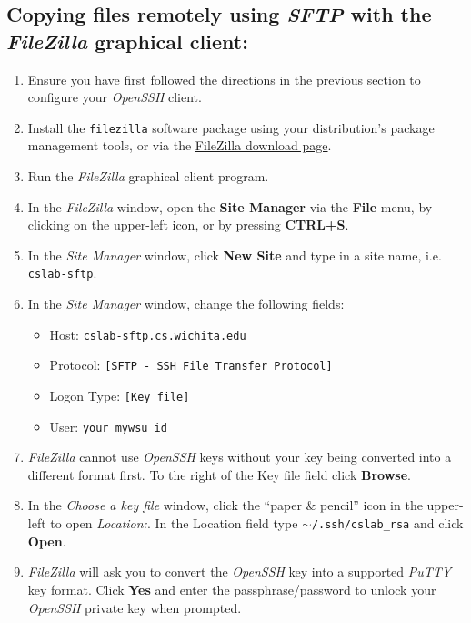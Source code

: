 \documentclass[12pt]{article}
\begin{document}
\begin{flushleft}
\subsection*{Copying files remotely using \textit{SFTP} with the \textit{FileZilla} graphical client:}
\begin{enumerate}
  \item Ensure you have first followed the directions in the previous section to configure your \textit{OpenSSH} client.
  \item Install the \texttt{filezilla} software package using your distribution's package management tools, or via the \href{https://filezilla-project.org/download.php?type=client}{FileZilla download page}.
  \item Run the \textit{FileZilla} graphical client program.
  \item In the \textit{FileZilla} window, open the \textbf{Site Manager} via the \textbf{File} menu, by clicking on the upper-left icon, or by pressing \textbf{CTRL+S}.
  \item In the \textit{Site Manager} window, click \textbf{New Site} and type in a site name, i.e. \texttt{cslab-sftp}.
  \item In the \textit{Site Manager} window, change the following fields:
  \begin{itemize}
    \item Host: \texttt{cslab-sftp.cs.wichita.edu}
    \item Protocol: \texttt{[SFTP - SSH File Transfer Protocol]}
    \item Logon Type: \texttt{[Key file]}
    \item User: \texttt{your\_mywsu\_id}
  \end{itemize}
  \item \textit{FileZilla} cannot use \textit{OpenSSH} keys without your key being converted into a different format first. To the right of the Key file field click \textbf{Browse}.
  \item In the \textit{Choose a key file} window, click the ``paper \& pencil'' icon in the upper-left to open \textit{Location:}. In the Location field type \texttt{$\sim$/.ssh/cslab\_rsa} and click \textbf{Open}.
  \item \textit{FileZilla} will ask you to convert the \textit{OpenSSH} key into a supported \textit{PuTTY} key format. Click \textbf{Yes} and enter the passphrase/password to unlock your \textit{OpenSSH} private key when prompted.

\end{enumerate}
\end{flushleft}
\end{document}
